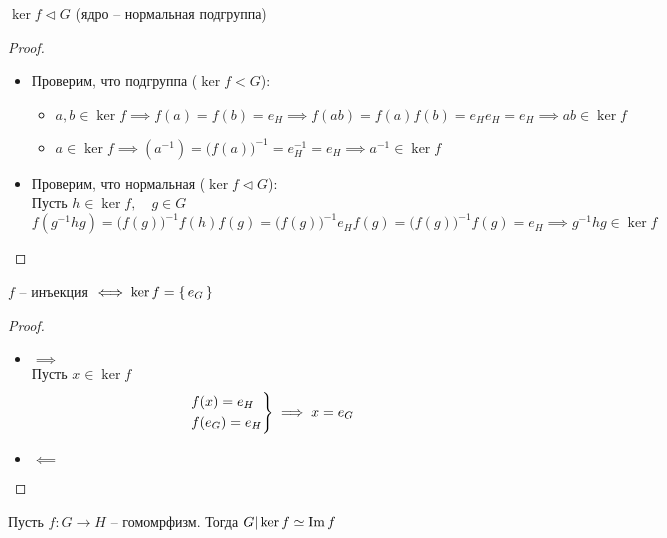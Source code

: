 \begin{props}
	\item $ \ker f \vartriangleleft G $ (ядро -- нормальная подгруппа)
    \begin{proof}
    	\hfill
        \begin{itemize}
        	\item Проверим, что подгруппа ($ \ker f < G $):
            \begin{itemize}
            	\item $ a, b \in \ker f \implies f(a) = f(b) = e_H \implies f(ab) = f(a)f(b) = e_He_H = e_H \implies ab \in \ker f $
                \item $ a \in \ker f \implies (a^{-1}) = \big( f(a) \big)^{-1} = e_H^{-1} = e_H \implies a^{-1} \in \ker f $
            \end{itemize}
            \item Проверим, что нормальная ($ \ker f \vartriangleleft G $): \\
            Пусть $ h \in \ker f, \quad g \in G $
            $$ f(g^{-1}hg) = \big( f(g) \big)^{-1}f(h)f(g) = \big( f(g) \big)^{-1}e_Hf(g) = \big( f(g) \big)^{-1}f(g) = e_H \implies g^{-1}hg \in \ker f $$
        \end{itemize}
    \end{proof}
    \item $ f $ -- инъекция $ \iff \ker f = \set{e_G} $
    \begin{proof}
    	\hfill
        \begin{itemize}
        	\item $ \implies $ \\
            Пусть $ x \in \ker f $
            $$
            \begin{rcases}
            	f(x) = e_H \\
                f(e_G) = e_H
            \end{rcases} \implies x = e_G $$
            \item $ \impliedby $ \\
            \widedots
        \end{itemize}
    \end{proof}
\end{props}

\begin{theorem}[о гомоморфизме]
	Пусть $ f : G \to H $ -- гомомрфизм. Тогда $ G|\ker f \simeq \operatorname{Im} f $
\end{theorem}

